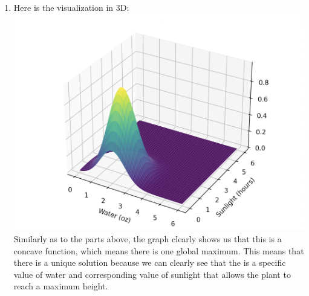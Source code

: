 \documentclass{harvardml}
\theoremstyle{definition}
\theoremstyle{plain}
\begin{document}
\begin{enumerate}
    \\
    \item
    Here is the visualization in 3D:\\
    \includegraphics[scale=0.5]{hw0/graph23.png}\\
    Similarly as to the parts above, the graph clearly shows us that this is a concave function, which means there is one global maximum. This means that there is a unique solution because we can clearly see that the is a specific value of water and corresponding value of sunlight that allows the plant to reach a maximum height.
\end{enumerate}
\end{document}
